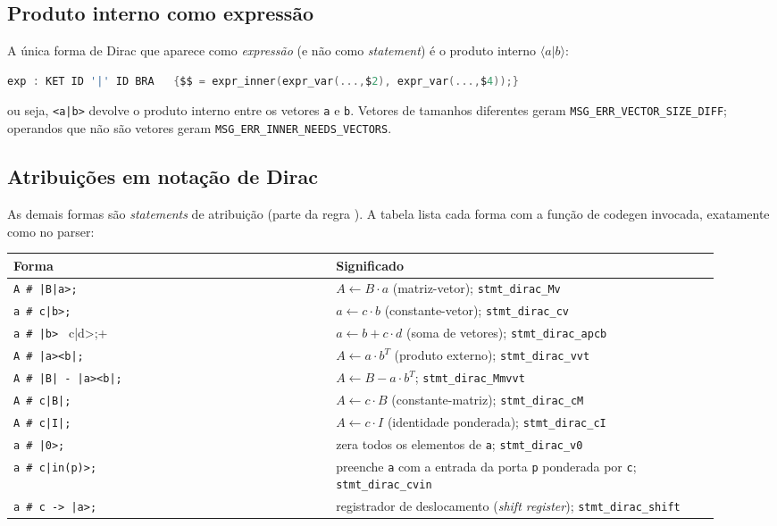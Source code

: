 \subsection{Produto interno como expressão}

A única forma de Dirac que aparece como \emph{expressão} (e não como
\emph{statement}) é o produto interno $\langle a | b \rangle$:

\begin{lstlisting}[language=C]
exp : KET ID '|' ID BRA   {$$ = expr_inner(expr_var(...,$2), expr_var(...,$4));}
\end{lstlisting}

ou seja, \lstinline+<a|b>+ devolve o produto interno entre os vetores
\lstinline|a| e \lstinline|b|. Vetores de tamanhos diferentes geram
\lstinline|MSG_ERR_VECTOR_SIZE_DIFF|; operandos que não são vetores geram
\lstinline|MSG_ERR_INNER_NEEDS_VECTORS|.

\subsection{Atribuições em notação de Dirac}

As demais formas são \emph{statements} de atribuição (parte da regra
). A tabela lista cada forma com a função de codegen invocada,
exatamente como no parser:

\begin{longtable}{@{}p{0.42\linewidth}p{0.50\linewidth}@{}}
\toprule
\textbf{Forma} & \textbf{Significado} \\
\midrule
\endhead
\lstinline+A # |B|a>;+ & $A \leftarrow B \cdot a$ (matriz-vetor); \lstinline|stmt_dirac_Mv| \\
\lstinline+a # c|b>;+ & $a \leftarrow c \cdot b$ (constante-vetor); \lstinline|stmt_dirac_cv| \\
\lstinline+a # |b> + c|d>;+ & $a \leftarrow b + c \cdot d$ (soma de vetores); \lstinline|stmt_dirac_apcb| \\
\lstinline+A # |a><b|;+ & $A \leftarrow a \cdot b^{T}$ (produto externo); \lstinline|stmt_dirac_vvt| \\
\lstinline+A # |B| - |a><b|;+ & $A \leftarrow B - a \cdot b^{T}$; \lstinline|stmt_dirac_Mmvvt| \\
\lstinline+A # c|B|;+ & $A \leftarrow c \cdot B$ (constante-matriz); \lstinline|stmt_dirac_cM| \\
\lstinline+A # c|I|;+ & $A \leftarrow c \cdot I$ (identidade ponderada); \lstinline|stmt_dirac_cI| \\
\lstinline+a # |0>;+ & zera todos os elementos de \lstinline|a|; \lstinline|stmt_dirac_v0| \\
\lstinline+a # c|in(p)>;+ & preenche \lstinline|a| com a entrada da porta \lstinline|p| ponderada por \lstinline|c|; \lstinline|stmt_dirac_cvin| \\
\lstinline+a # c -> |a>;+ & registrador de deslocamento (\emph{shift register}); \lstinline|stmt_dirac_shift| \\
\bottomrule
\end{longtable}

